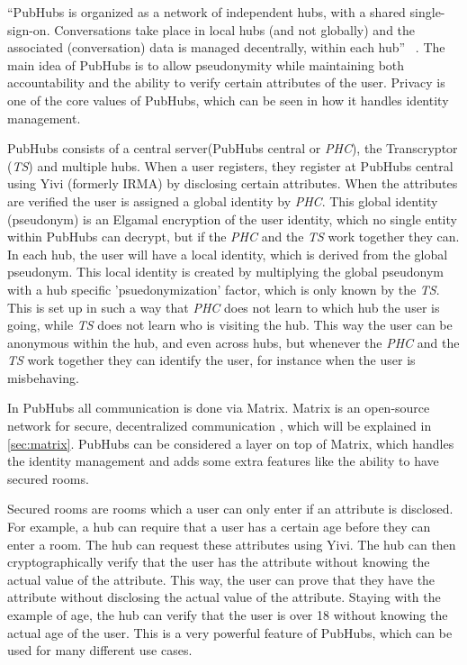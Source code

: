 \documentclass{report}
\begin{document}
“PubHubs is organized as a network of independent hubs, with a shared single-sign-on. Conversations take place in
local hubs (and not globally) and the associated (conversation) data is managed decentrally, within each hub”~
\cite{jacobs_pubhubs_2023}. The main idea of PubHubs is to allow pseudonymity while maintaining both accountability
and the ability to verify certain attributes of the user. Privacy is one of the core values of PubHubs, which can be
seen in how it handles identity management.

PubHubs consists of a central server(PubHubs central or \textit{PHC}), the Transcryptor (\textit{TS}) and multiple
hubs.
When a user registers, they register at PubHubs central using Yivi (formerly IRMA)\cite{alpar_irma_nodate} by disclosing
certain attributes. When the attributes are verified the user is assigned a global identity by \textit{PHC}.
This global identity (pseudonym) is an Elgamal encryption of the user identity, which no single entity within PubHubs
can decrypt, but if the \textit{PHC} and the \textit{TS} work together they can. In each hub, the user will have a
local identity, which is derived from the global pseudonym. This local identity is created by multiplying the
global pseudonym with a hub specific 'psuedonymization' factor, which is only known by the \textit{TS}. This is set
up in such a way that \textit{PHC} does not learn to which hub the user is going, while \textit{TS} does not learn
who is visiting the hub. This way the user can be anonymous within the hub, and even across hubs, but whenever the
\textit{PHC} and the \textit{TS} work together they can identify the user, for instance when the user is misbehaving.

In PubHubs all communication is done via Matrix. Matrix is an open-source network for secure, decentralized
communication \cite{noauthor_matrixorg_nodate}, which will be explained in \autoref{sec:matrix}. PubHubs can be considered a
layer on top of Matrix, which handles the identity management and adds some extra features like the ability to have
secured rooms.

Secured rooms are rooms which a user can only enter if an attribute is disclosed. For example, a hub can require
that a user has a certain age before they can enter a room. The hub can request these attributes using Yivi. The hub
can then cryptographically verify that the user has the attribute without knowing the actual
value of the attribute. This way, the user can prove that they have the attribute without disclosing the actual
value of the attribute. Staying with the example of age, the hub can verify that the user is over 18 without knowing
the actual age of the user. This is a very powerful feature of PubHubs, which can be used for many different use cases.
\end{document}
